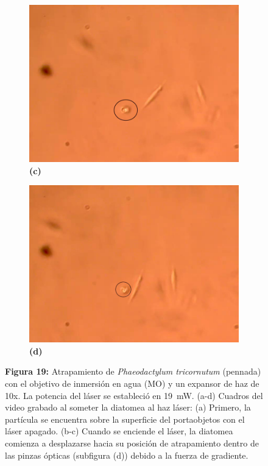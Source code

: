 \documentclass[10pt,aspectratio=1610,compress,dvipsnames]{beamer}
\begin{document}
\begin{frame}
{\begin{figure}
  \begin{subfigure}[b]{0.2\linewidth}
    \includegraphics[width=\linewidth]{Results/Resultadosalgea2/secondalgeawater3.png} %
    \caption*{\textbf{(c)}}
    \label{fig7:c}
  \end{subfigure}\hspace{0.5cm} %
  \begin{subfigure}[b]{0.2\linewidth}
    \includegraphics[width=\linewidth]{Results/Resultadosalgea2/secondalgeawater4.png} %
    \caption*{\textbf{(d)}}
    \label{fig7:d}
  \end{subfigure}
   \captionsetup{labelformat = empty}
  \caption{\textbf{Figura 19: }
Atrapamiento de \textit{Phaeodactylum tricornutum} (pennada) con el objetivo de inmersión en agua (MO) y un expansor de haz de 10x. La potencia del láser se estableció en 19~mW. (a-d) Cuadros del video grabado al someter la diatomea al haz láser: (a) Primero, la partícula se encuentra sobre la superficie del portaobjetos con el láser apagado. (b-c) Cuando se enciende el láser, la diatomea comienza a desplazarse hacia su posición de atrapamiento dentro de las pinzas ópticas (subfigura (d)) debido a la fuerza de gradiente. }
  \label{poresfrustrules}
\end{figure}


}
\end{frame}
\end{document}

